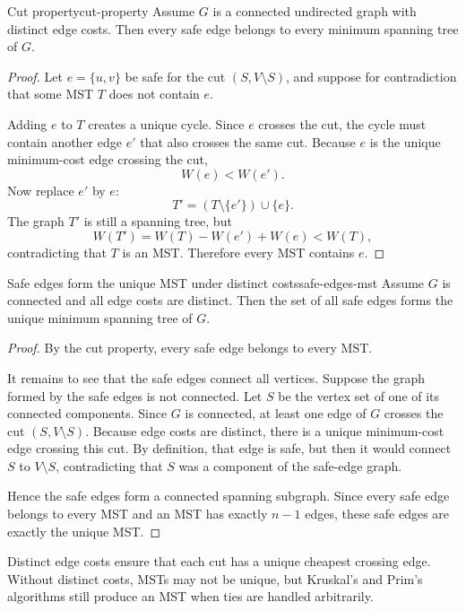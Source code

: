 \begin{theorem}{Cut property}{cut-property}
Assume \(G\) is a connected undirected graph with distinct edge costs. Then every safe edge belongs to every minimum spanning tree of \(G\).
\end{theorem}

\begin{proof}
Let \(e=\{u,v\}\) be safe for the cut \((S,V\setminus S)\), and suppose for contradiction that some MST \(T\) does not contain \(e\).

Adding \(e\) to \(T\) creates a unique cycle. Since \(e\) crosses the cut, the cycle must contain another edge \(e'\) that also crosses the same cut. Because \(e\) is the unique minimum-cost edge crossing the cut,
\[
W(e)<W(e').
\]
Now replace \(e'\) by \(e\):
\[
T'=(T\setminus\{e'\})\cup\{e\}.
\]
The graph \(T'\) is still a spanning tree, but
\[
W(T')=W(T)-W(e')+W(e)<W(T),
\]
contradicting that \(T\) is an MST. Therefore every MST contains \(e\).
\end{proof}

\begin{theorem}{Safe edges form the unique MST under distinct costs}{safe-edges-mst}
Assume \(G\) is connected and all edge costs are distinct. Then the set of all safe edges forms the unique minimum spanning tree of \(G\).
\end{theorem}

\begin{proof}
By the cut property, every safe edge belongs to every MST.

It remains to see that the safe edges connect all vertices. Suppose the graph formed by the safe edges is not connected. Let \(S\) be the vertex set of one of its connected components. Since \(G\) is connected, at least one edge of \(G\) crosses the cut \((S,V\setminus S)\). Because edge costs are distinct, there is a unique minimum-cost edge crossing this cut. By definition, that edge is safe, but then it would connect \(S\) to \(V\setminus S\), contradicting that \(S\) was a component of the safe-edge graph.

Hence the safe edges form a connected spanning subgraph. Since every safe edge belongs to every MST and an MST has exactly \(n-1\) edges, these safe edges are exactly the unique MST.
\end{proof}

\begin{extension}[title={Why distinct costs simplify the theory}]
Distinct edge costs ensure that each cut has a unique cheapest crossing edge. Without distinct costs, MSTs may not be unique, but Kruskal's and Prim's algorithms still produce an MST when ties are handled arbitrarily.
\end{extension}

